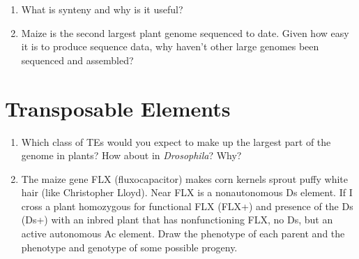 \documentclass[]{article}
\begin{document}
\begin{enumerate}
\item What is synteny and why is it useful?
\item Maize is the second largest plant genome sequenced to date. Given how easy it is to produce sequence data, why haven’t other large genomes been sequenced and assembled?
\end{enumerate}

\section*{Transposable Elements}
\begin{enumerate}
\item Which class of TEs would you expect to make up the largest part of the genome in plants? How about in \emph{Drosophila}? Why?
\item The maize gene FLX (fluxocapacitor) makes corn kernels sprout puffy white hair (like Christopher Lloyd). Near FLX is a nonautonomous Ds element. If I cross a plant homozygous for functional FLX (FLX+) and presence of the Ds (Ds+) with an inbred plant that has nonfunctioning FLX, no Ds, but an active autonomous Ac element. Draw the phenotype of each parent and the phenotype and genotype of some possible progeny.
\end{enumerate}
\end{document}
